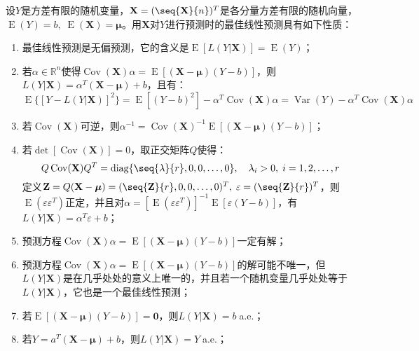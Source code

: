 \begin{property}\label{prop:BestLinearForcast}
	设$Y$是方差有限的随机变量，$\mathbf{X}=(\seq{\mathbf{X}}{n})^T$是各分量方差有限的随机向量，$\operatorname{E}(Y)=b,\;\operatorname{E}(\mathbf{X})=\boldsymbol{\mu}$。用$\mathbf{X}$对$Y$进行预测时的最佳线性预测具有如下性质：
	\begin{enumerate}
		\item 最佳线性预测是无偏预测，它的含义是$\operatorname{E}[L(Y|\mathbf{X})]=\operatorname{E}(Y)$；
		\item 若$\alpha\in\mathbb{R}^{n}$使得$\operatorname{Cov}(\mathbf{X})\alpha=\operatorname{E}[(\mathbf{X}-\boldsymbol{\mu})(Y-b)]$，则$L(Y|\mathbf{X})=\alpha^T(\mathbf{X}-\boldsymbol{\mu})+b$，且有：
		\begin{equation*}
			\operatorname{E}\{[Y-L(Y|\mathbf{X})]^2\}=\operatorname{E}[(Y-b)^2]-\alpha^T\operatorname{Cov}(\mathbf{X})\alpha=\operatorname{Var}(Y)-\alpha^T\operatorname{Cov}(\mathbf{X})\alpha
		\end{equation*}
		\item 若$\operatorname{Cov}(\mathbf{X})$可逆，则$\alpha^{-1}=\operatorname{Cov}(\mathbf{X})^{-1}\operatorname{E}[(\mathbf{X}-\boldsymbol{\mu})(Y-b)]$；
		\item 若$\det[\operatorname{Cov}(\mathbf{X})]=0$，取正交矩阵$Q$使得：
		\begin{equation*}
			Q\operatorname{Cov}(\mathbf{X})Q^T=\operatorname{diag}\{\seq{\lambda}{r},0,0,\dots,0\},\quad\lambda_i>0,\;i=1,2,\dots,r
		\end{equation*}
		定义$\mathbf{Z}=Q(\mathbf{X}-\boldsymbol{\mu})=(\seq{\mathbf{Z}}{r},0,0,\dots,0)^T,\;\varepsilon=(\seq{\mathbf{Z}}{r})^T$，则$\operatorname{E}(\varepsilon\varepsilon^T)$正定，并且对$\alpha=[\operatorname{E}(\varepsilon\varepsilon^T)]^{-1}\operatorname{E}[\varepsilon(Y-b)]$，有$L(Y|\mathbf{X})=\alpha^T\varepsilon+b$；
		\item 预测方程$\operatorname{Cov}(\mathbf{X})\alpha=\operatorname{E}[(\mathbf{X}-\boldsymbol{\mu})(Y-b)]$一定有解；
		\item 预测方程$\operatorname{Cov}(\mathbf{X})\alpha=\operatorname{E}[(\mathbf{X}-\boldsymbol{\mu})(Y-b)]$的解可能不唯一，但$L(Y|\mathbf{X})$是在几乎处处的意义上唯一的，并且若一个随机变量几乎处处等于$L(Y|\mathbf{X})$，它也是一个最佳线性预测；
		\item 若$\operatorname{E}[(\mathbf{X}-\boldsymbol{\mu})(Y-b)]=\mathbf{0}$，则$L(Y|\mathbf{X})=b\;$a.e.；
		\item 若$Y=a^T(\mathbf{X}-\boldsymbol{\mu})+b$，则$L(Y|\mathbf{X})=Y\;$a.e.；

\end{enumerate}
\end{property}
